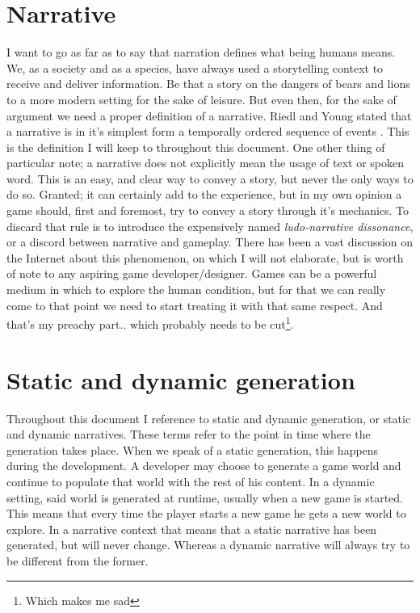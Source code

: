 \section{Narrative}
I want to go as far as to say that narration defines what being humans means. We, as a society and as a species, have always used a storytelling context to receive and deliver information. Be that a story on the dangers of bears and lions to a more modern setting for the sake of leisure. But even then, for the sake of argument we need a proper definition of a narrative. Riedl and Young stated that a narrative is in it's simplest form a temporally ordered sequence of events \citep{Riedl:2004:IPM:1018409.1018753}. This is the definition I will keep to throughout this document. One other thing of particular note; a narrative does not explicitly mean the usage of text or spoken word. This is an easy, and clear way to convey a story, but never the only ways to do so. Granted; it can certainly add to the experience, but in my own opinion a game should, first and foremost, try to convey a story through it's mechanics. To discard that rule is to introduce the expensively named \textit{ludo-narrative dissonance}, or a discord between narrative and gameplay. There has been a vast discussion on the Internet about this phenomenon, on which I will not elaborate, but is worth of note to any aspiring game developer/designer. Games can be a powerful medium in which to explore the human condition, but for that we can really come to that point we need to start treating it with that same respect. And that's my preachy part.. which probably needs to be cut\footnote{Which makes me sad}.
\section{Static and dynamic generation}
\label{sec:static_dynamic_generation}
Throughout this document I reference to static and dynamic generation, or static and dynamic narratives. These terms refer to the point in time where the generation takes place. When we speak of a static generation, this happens during the development. A developer may choose to generate a game world and continue to populate that world with the rest of his content. In a dynamic setting, said world is generated at runtime, usually when a new game is started. This means that every time the player starts a new game he gets a new world to explore. In a narrative context that means that a static narrative has been generated, but will never change. Whereas a dynamic narrative will always try to be different from the former.
